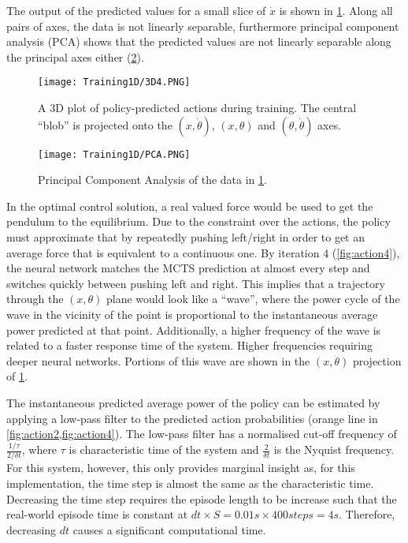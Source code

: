 \documentclass[../main.tex]{subfiles}
\begin{document}
The output of the predicted values for a small slice of $\dot{x}$ is shown in \cref{fig:3D4}. Along all pairs of axes, the data is not linearly separable, furthermore principal component analysis (PCA) shows that the predicted values are not linearly separable along the principal axes either (\cref{fig:PCA}).

\begin{figure}[H]
    \centering
    \texttt{[image: Training1D/3D4.PNG]}
    \caption{A 3D plot of policy-predicted actions during training. The central ``blob'' is projected onto the $(x,\dot{\theta})$, $(x, \theta)$ and $(\theta, \dot{\theta})$ axes.}
    \label{fig:3D4}
\end{figure}

\begin{figure}[H]
    \centering
    \texttt{[image: Training1D/PCA.PNG]}
    \caption{Principal Component Analysis of the data in \cref{fig:3D4}.}
    \label{fig:PCA}
\end{figure}

In the optimal control solution, a real valued force would be used to get the pendulum to the equilibrium. Due to the constraint over the actions, the policy must approximate that by repeatedly pushing left/right in order to get an average force that is equivalent to a continuous one. By iteration 4 (\cref{fig:action4}), the neural network matches the MCTS prediction at almost every step and switches quickly between pushing left and right. This implies that a trajectory through the $(x, \theta)$ plane would look like a ``wave'', where the power cycle of the wave in the vicinity of the point is proportional to the instantaneous average power predicted at that point. Additionally, a higher frequency of the wave is related to a faster response time of the system. Higher frequencies requiring deeper neural networks. Portions of this wave are shown in the $(x, \theta)$ projection of \cref{fig:3D4}.

The instantaneous predicted average power of the policy can be estimated by applying a low-pass filter to the predicted action probabilities (orange line in \cref{fig:action2,fig:action4}). The low-pass filter has a normalised cut-off frequency of $\frac{1/\tau}{2/\delta t}$, where $\tau$ is characteristic time of the system and $\frac{2}{\delta t}$ is the Nyquist frequency. For this system, however, this only provides marginal insight as, for this implementation, the time step is almost the same as the characteristic time. Decreasing the time step requires the episode length to be increase such that the real-world episode time is constant at $dt\times S = 0.01s \times 400steps = 4s$. Therefore, decreasing $dt$ causes a significant computational time.
\end{document}
